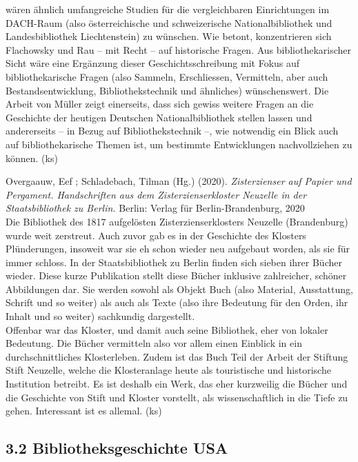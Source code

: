 \documentclass[a4paper,
fontsize=11pt,
oneside,
numbers=noperiodatend,
parskip=half-,
bibliography=totoc,
final
]{scrartcl}
\begin{document}
wären ähnlich umfangreiche Studien für die vergleichbaren Einrichtungen
im DACH-Raum (also österreichische und schweizerische Nationalbibliothek
und Landesbibliothek Liechtenstein) zu wünschen. Wie betont,
konzentrieren sich Flachowsky und Rau -- mit Recht -- auf historische
Fragen. Aus bibliothekarischer Sicht wäre eine Ergänzung dieser
Geschichtsschreibung mit Fokus auf bibliothekarische Fragen (also
Sammeln, Erschliessen, Vermitteln, aber auch Bestandsentwicklung,
Bibliothekstechnik und ähnliches) wünschenswert. Die Arbeit von Müller
zeigt einerseits, dass sich gewiss weitere Fragen an die Geschichte der
heutigen Deutschen Nationalbibliothek stellen lassen und andererseits --
in Bezug auf Bibliothekstechnik --, wie notwendig ein Blick auch auf
bibliothekarische Themen ist, um bestimmte Entwicklungen nachvollziehen
zu können. (ks)

Overgaauw, Eef ; Schladebach, Tilman (Hg.) (2020). \emph{Zisterzienser
auf Papier und Pergament. Handschriften aus dem Zisterzienserkloster
Neuzelle in der Staatsbibliothek zu Berlin.} Berlin: Verlag für
Berlin-Brandenburg, 2020\\
Die Bibliothek des 1817 aufgelösten Zisterzienserklosters Neuzelle
(Brandenburg) wurde weit zerstreut. Auch zuvor gab es in der Geschichte
des Klosters Plünderungen, insoweit war sie eh schon wieder neu
aufgebaut worden, als sie für immer schloss. In der Staatsbibliothek zu
Berlin finden sich sieben ihrer Bücher wieder. Diese kurze Publikation
stellt diese Bücher inklusive zahlreicher, schöner Abbildungen dar. Sie
werden sowohl als Objekt Buch (also Material, Ausstattung, Schrift und
so weiter) als auch als Texte (also ihre Bedeutung für den Orden, ihr
Inhalt und so weiter) sachkundig dargestellt.\\
Offenbar war das Kloster, und damit auch seine Bibliothek, eher von
lokaler Bedeutung. Die Bücher vermitteln also vor allem einen Einblick
in ein durchschnittliches Klosterleben. Zudem ist das Buch Teil der
Arbeit der Stiftung Stift Neuzelle, welche die Klosteranlage heute als
touristische und historische Institution betreibt. Es ist deshalb ein
Werk, das eher kurzweilig die Bücher und die Geschichte von Stift und
Kloster vorstellt, als wissenschaftlich in die Tiefe zu gehen.
Interessant ist es allemal. (ks)

\hypertarget{bibliotheksgeschichte-usa}{%
\subsection{3.2 Bibliotheksgeschichte
USA}\label{bibliotheksgeschichte-usa}}
\end{document}
